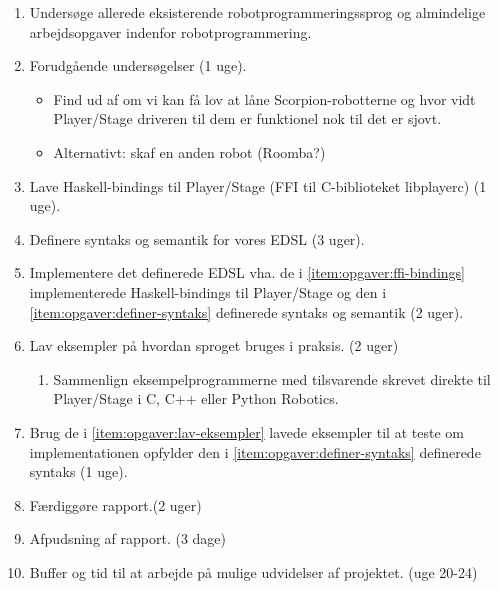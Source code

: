 \documentclass[a4paper,oneside, draft]{memoir}
\begin{document}
\begin{enumerate}

\item Undersøge allerede eksisterende robotprogrammeringssprog og almindelige
  arbejdsopgaver indenfor robotprogrammering.

\item Forudgående undersøgelser (1 uge).
  
  \begin{itemize}
    
  \item Find ud af om vi kan få lov at låne Scorpion-robotterne og hvor
    vidt Player/Stage driveren til dem er funktionel nok til det er sjovt.
    
  \item Alternativt: skaf en anden robot (Roomba?)
    
  \end{itemize}

\item Lave Haskell-bindings til Player/Stage (FFI til C-biblioteket libplayerc)
  (1 uge).
  \label{item:opgaver:ffi-bindings}

\item Definere syntaks og semantik for vores EDSL (3 uger).
  \label{item:opgaver:definer-syntaks}

\item Implementere det definerede EDSL vha. de i \ref{item:opgaver:ffi-bindings}
  implementerede Haskell-bindings til Player/Stage og den i
  \ref{item:opgaver:definer-syntaks} definerede syntaks og semantik (2 uger).

\item Lav eksempler på hvordan sproget bruges i praksis. (2 uger)
  \label{item:opgaver:lav-eksempler}

  \begin{enumerate}
  
  \item Sammenlign eksempelprogrammerne med tilsvarende skrevet direkte til
    Player/Stage i C, C++ eller Python Robotics.
  
  \end{enumerate}
  
  
\item Brug de i \ref{item:opgaver:lav-eksempler} lavede eksempler til at teste
  om implementationen opfylder den i \ref{item:opgaver:definer-syntaks}
  definerede syntaks (1 uge).
  
\item Færdiggøre rapport.(2 uger)
  
\item Afpudsning af rapport. (3 dage)
  
\item Buffer og tid til at arbejde på mulige udvidelser af projektet. (uge 20-24)
\end{enumerate}
\end{document}
